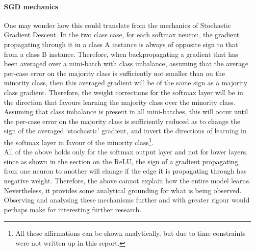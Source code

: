 \documentclass[a4paper,11pt]{article}
\begin{document}
\paragraph{SGD mechanics}

One may wonder how this could translate from the mechanics of Stochastic Gradient Descent. In the two class case, for each softmax neuron, the gradient propagating through it in a class A instance is always of opposite sign to that from a class B instance. Therefore, when backpropagating a gradient that has been averaged over a mini-batch with class imbalance, assuming that the average per-case error on the majority class is sufficiently not smaller than on the minority class, then this averaged gradient will be of the same sign as a majority class gradient. Therefore, the weight corrections for the softmax layer will be in the direction that favours learning the majority class over the minority class. Assuming that class imbalance is present in all mini-batches, this will occur until the per-case error on the majority class is sufficiently reduced as to change the sign of the averaged `stochastic' gradient, and invert the directions of learning in the softmax layer in favour of the minority class\footnote{All these affirmations can be shown analytically, but due to time constraints were not written up in this report.}. \\

All of the above holds only for the softmax output layer and not for lower layers, since as shown in the section on the ReLU, the sign of a gradient propagating from one neuron to another will change if the edge it is propagating through has negative weight. Therefore, the above cannot explain how the entire model learns. Nevertheless, it provides some analytical grounding for what is being observed. Observing and analysing these mechanisms further and with greater rigour would perhaps make for interesting further research.

%
%
\end{document}
